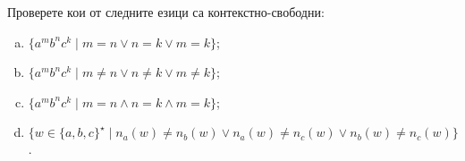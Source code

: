 
\begin{problem}
  Проверете кои от следните езици са контекстно-свободни:
  \begin{enumerate}[a)]
  \item
    $\{a^mb^nc^k\mid m = n \vee n = k \vee m = k\}$;
  \item
    $\{a^mb^nc^k\mid m \neq n \vee n \neq k \vee m \neq k\}$;
  \item
    $\{a^mb^nc^k\mid m = n \wedge n = k \wedge m = k\}$;
  \item
    $\{w \in \{a,b,c\}^\star\mid n_a(w) \neq n_b(w) \vee n_a(w) \neq n_c(w) \vee n_b(w) \neq n_c(w)\}$.
  \end{enumerate}
\end{problem}

